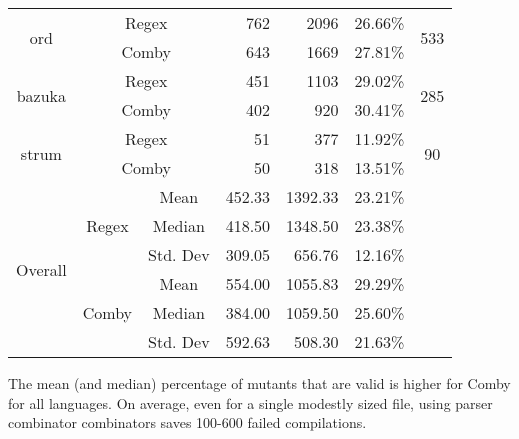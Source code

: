 \documentclass[sigconf,review, anonymous]{acmart}
\begin{document}
{\begin{table}[hbtp]
{\begin{tabular}{|c|c|c|r|r|r|c|}
\multirow{2}{*}{ord} & \multicolumn{2}{c|}{Regex} & 762 \hspace{8pt}	& 2096 \hspace{8pt} & 26.66\% & \multirow{2}{*}{533}\\\cline{2-6}
    & \multicolumn{2}{c|}{Comby} & 643 \hspace{8pt} & 1669 \hspace{8pt} & 27.81\% & \\ \hline
\multirow{2}{*}{bazuka} & \multicolumn{2}{c|}{Regex} & 451 \hspace{8pt} & 1103 \hspace{8pt} & 29.02\% & \multirow{2}{*}{285}\\\cline{2-6}
    & \multicolumn{2}{c|}{Comby} & 402 \hspace{8pt} & 920 \hspace{8pt} & 30.41\% & \\ \hline
\multirow{2}{*}{strum} & \multicolumn{2}{c|}{Regex} & 51 \hspace{8pt} & 377 \hspace{8pt}	& 11.92\% & \multirow{2}{*}{90}\\\cline{2-6}
    & \multicolumn{2}{c|}{Comby} & 50 \hspace{8pt} & 318 \hspace{8pt}	& 13.51\% & \\ \hline

\multirow{6}{*}{Overall} & \multirow{3}{*}{Regex} & Mean & 452.33 & 1392.33	& 23.21\% & \\\cline{3-6}
    &   &  Median & 418.50 & 1348.50 & 23.38\%  & \\\cline{3-6}
    &   &  Std. Dev & 309.05 & 656.76 & 12.16\%  & \\\cline{2-6}

 & \multirow{3}{*}{Comby} & Mean & 554.00 & 1055.83	& 29.29\% & \\\cline{3-6}
    &   &  Median & 384.00 & 1059.50	& 25.60\%  & \\\cline{3-6}
    &   &  Std. Dev & 592.63 & 508.30 & 21.63\%  & \\\hline


\end{tabular}

}
\end{table}

The mean (and median) percentage of mutants that are valid is higher for
Comby for all languages.  On average, even for a single modestly sized
file, using parser combinator combinators saves 100-600 failed
compilations.

}
\end{document}
